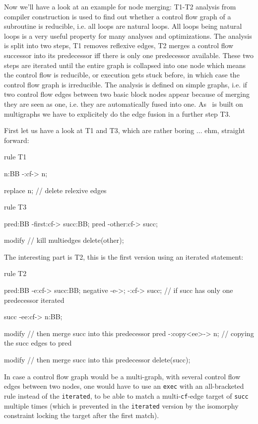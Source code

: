 Now we'll have a look at an example for node merging: T1-T2 analysis from compiler construction is used to find out whether a control flow graph of a subroutine is reducible, i.e. all loops are natural loops. All loops being natural loops is a very useful property for many analyses and optimizations. The analysis is split into two steps, T1 removes reflexive edges, T2 merges a control flow successor into its predecessor iff there is only one predecessor available. These two steps are iterated until the entire graph is collapsed into one node which means the control flow is reducible, or execution gets stuck before, in which case the control flow graph is irreducible.
The analysis is defined on simple graphs, i.e. if two control flow edges between two basic block nodes appear because of merging they are seen as one, i.e. they are automatically fused into one. As \GrG~is built on multigraphs we have to explicitely do the edge fusion in a further step T3.

First let us have a look at T1 and T3, which are rather boring ... ehm, straight forward:

  \begin{example}
    \begin{grgen}
rule T1
{
  n:BB -:cf-> n;
  
  replace {
    n; // delete relexive edges
  }
}

rule T3
{
  pred:BB -first:cf-> succ:BB;
  pred    -other:cf-> succ;
  
  modify { // kill multiedges
    delete(other);
  }
}
    \end{grgen}
  \end{example}

The interesting part is T2, this is the first version using an iterated statement:

  \begin{example}
    \begin{grgen}
rule T2
{
  pred:BB -e:cf-> succ:BB;
  negative {
    -e->;
    -:cf-> succ; // if succ has only one predecessor
  }
  iterated {
    succ -ee:cf-> n:BB;
    
    modify { // then merge succ into this predecessor
      pred -:copy<ee>-> n; // copying the succ edges to pred
    }
  }
  
  modify { // then merge succ into this predecessor
    delete(succ);
  }
}
    \end{grgen}
  \end{example}

In case a control flow graph would be a multi-graph, with several control flow edges between two nodes, one would have to use an \texttt{exec} with an all-bracketed rule instead of the \texttt{iterated}, to be able to match a multi-\texttt{cf}-edge target of \texttt{succ} multiple times (which is prevented in the \texttt{iterated} version by the isomorphy constraint locking the target after the first match).

